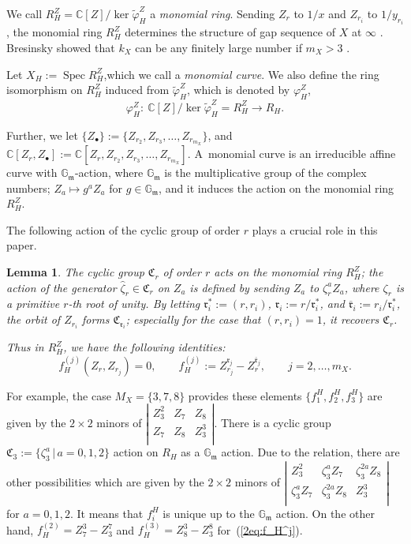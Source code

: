 \documentclass[10pt,a4paper]{amsart}
\def\CC{{\mathbb C}}
\def\GG{{\mathbb G}}
\def\fC{{\mathfrak C}}
\def\fm{{\mathfrak m}}
\def\fr{{\mathfrak r}}
\def\tvarphi{{\widetilde \varphi}}
\def\Bfr{{\overline{\mathfrak r}}}
\def\hzeta{{\widehat \zeta}}
\def\Spec{\operatorname{Spec}}
\numberwithin{equation}{section}
\newtheorem{Lemma}[Theorem]{Lemma}
\begin{document}
We call $R^Z_H=\CC[Z]/ \ker\tvarphi^Z_H$ a \emph{monomial ring}.
Sending $Z_r$ to $1/x$ and $Z_{r_i}$ to $1/y_{r_i}$, the monomial ring $R^Z_H$
determines the structure of gap sequence of $X$ at $\infty$ \cite{Herzog70, Pinkham74}.
Bresinsky showed that $k_X$ can be any finitely large number if $m_X>3$ \cite{Bresinsky}.

Let $X_H:=\Spec R_H^Z$,which we call a \emph{monomial curve}.
We also define the ring isomorphism on $R_H^Z$ induced from $\tvarphi^Z_H$, which is denoted by $\varphi^Z_H$,
\begin{equation*}
\varphi^Z_H\colon \ \CC[Z]/ \ker\tvarphi^Z_H=R^Z_H \to R_H.%
\end{equation*}

Further, we let $\{Z_{\bullet}\}:=\{Z_{r_2}, Z_{r_3}, \dots, Z_{r_{m_X}}\}$, and $\CC[Z_r, Z_{\bullet}]:=\CC[Z_r, Z_{r_2}, Z_{r_3}, \dots, Z_{r_{m_X}}]$.
A~monomial curve is an irreducible affine curve with $\GG_\fm$-action, where $\GG_\fm$ is the multiplicative group of the complex numbers; $Z_a \mapsto g^{a} Z_a$ for $g\in \GG_\fm$, and it induces the action on the monomial ring $R_H^Z$.

The following action of the cyclic group of order $r$ plays a crucial role in this paper.

\begin{Lemma} \label{2lm:fC_r_action}
The cyclic group $\fC_r$ of order $r$ acts on the monomial ring $R_H^Z$;
the action of the generator $\hzeta_r \in \fC_r$ on $Z_a$ is defined by sending $Z_a$ to $\zeta_r^{a}Z_a$, where $\zeta_r$ is a primitive $r$-th root of unity.
By letting $\fr_i^*:=(r, r_i)$, $\fr_i := r/\fr_i^*$, and $\Bfr_i:=r_i/\fr_i^*$, the orbit of $Z_{r_i}$ forms $\fC_{\fr_i}$; especially for the case that $(r, r_i) = 1$, it recovers $\fC_r$.

Thus in $R_H^Z$, we have the following identities:
\begin{equation}
f_H^{(j)}(Z_r, Z_{r_j})= 0, \qquad f_H^{(j)}:=Z_{r_j}^{\fr_j}-Z_r^{\Bfr_j},
\qquad j = 2, \dots, m_X.\label{2eq:f_H^j}
\end{equation}
\end{Lemma}

For example, the case $M_X=\{3,7,8\}$ provides these elements $\big\{f^H_1,f^H_2, f^H_3\big\}$ are given by the $2 \times 2$ minors of
$\left|\begin{smallmatrix}
 Z_3^2 & Z_7 & Z_8 \\
 Z_7 & Z_8 & Z_3^3\\
\end{smallmatrix} \right|$.
There is a cyclic group $\fC_3:=\{\zeta_3^a\, | \, a=0,1,2\}$ action on $R_H$ as a $\GG_\fm$ action. Due to the relation, there are other possibilities which are given by the $2 \times 2$ minors of
$
\left|\begin{smallmatrix}
 Z_3^2 & \zeta_3^a Z_7 & \zeta_3^{2a}Z_8 \\
\zeta_3^a Z_7 & \zeta_3^{2a}Z_8 & Z_3^3\\
\end{smallmatrix} \right|$ for $a=0,1,2$.
It means that $f^H_i$ is unique up to the $\GG_\fm$ action.
On the other hand, $f_H^{(2)}=Z_7^3-Z_3^7$ and $f_H^{(3)}=Z_8^3-Z_3^8$ for~(\ref{2eq:f_H^j}).
\end{document}
